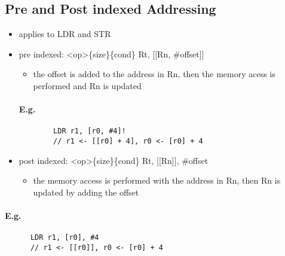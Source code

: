 \documentclass[12pt]{report}
\begin{document}
  \subsection{Pre and Post indexed Addressing}
    \begin{itemize}
      \item applies to LDR and STR
      \item pre indexed: \textless op\textgreater \{size\}\{cond\} Rt, [[Rn,
      \#offset]]
      \begin{itemize}
        \item the offset is added to the address in Rn, then the memory acess
        is performed and Rn is updated
      \end{itemize}

      \paragraph{E.g.}
      \begin{lstlisting}
        LDR r1, [r0, #4]!
        // r1 <- [[r0] + 4], r0 <- [r0] + 4
      \end{lstlisting}

      \item post indexed: \textless op\textgreater \{size\}\{cond\} Rt, [[Rn]],
      \#offset
      \begin{itemize}
        \item the memory access is performed with the address in Rn, then Rn is
        updated by adding the offset
      \end{itemize}
    \end{itemize}

    \paragraph{E.g.}
    \begin{lstlisting}
      LDR r1, [r0], #4
      // r1 <- [[r0]], r0 <- [r0] + 4
    \end{lstlisting}
\end{document}
